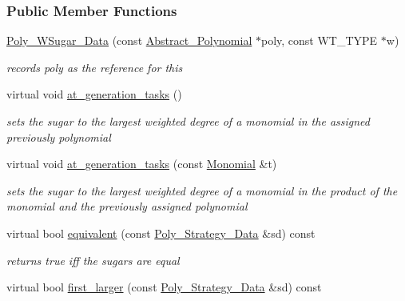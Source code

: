\subsubsection*{Public Member Functions}
\begin{DoxyCompactItemize}
\item 
\hyperlink{group__strategygroup_a1f64d0099befd970d362c0166be1b652}{Poly\+\_\+\+W\+Sugar\+\_\+\+Data} (const \hyperlink{group__polygroup_class_abstract___polynomial}{Abstract\+\_\+\+Polynomial} $\ast$poly, const W\+T\+\_\+\+T\+Y\+PE $\ast$w)
\begin{DoxyCompactList}\small\item\em records {\ttfamily poly} as the reference for {\ttfamily this} \end{DoxyCompactList}\item 
\mbox{\label{group__strategygroup_ac07ee9ee15bd97e5e8befb3f6cec3929}} 
virtual void \hyperlink{group__strategygroup_ac07ee9ee15bd97e5e8befb3f6cec3929}{at\+\_\+generation\+\_\+tasks} ()
\begin{DoxyCompactList}\small\item\em sets the sugar to the largest weighted degree of a monomial in the assigned previously polynomial \end{DoxyCompactList}\item 
virtual void \hyperlink{group__strategygroup_ac58bd8d30e7e10dbbe8e86b1d9d04376}{at\+\_\+generation\+\_\+tasks} (const \hyperlink{group__polygroup_class_monomial}{Monomial} \&t)
\begin{DoxyCompactList}\small\item\em sets the sugar to the largest weighted degree of a monomial in the product of the monomial and the previously assigned polynomial \end{DoxyCompactList}\item 
virtual bool \hyperlink{group__strategygroup_a50b4b29d57fb8bed56174733207369dd}{equivalent} (const \hyperlink{group__strategygroup_class_poly___strategy___data}{Poly\+\_\+\+Strategy\+\_\+\+Data} \&sd) const
\begin{DoxyCompactList}\small\item\em returns {\ttfamily true} iff the sugars are equal \end{DoxyCompactList}\item 
virtual bool \hyperlink{group__strategygroup_a83a899b8195beed8d72d692fe4c228a3}{first\+\_\+larger} (const \hyperlink{group__strategygroup_class_poly___strategy___data}{Poly\+\_\+\+Strategy\+\_\+\+Data} \&sd) const

\end{DoxyCompactItemize}
